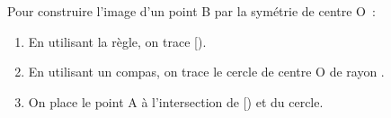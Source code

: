 Pour construire l'image d'un point B par la symétrie de centre O~:
\begin{enumerate}
    \item En utilisant la règle, on trace [).
    \item En utilisant un compas, on trace le cercle de centre O de rayon .
    \item On place le point A à l'intersection de [) et du cercle.
\end{enumerate}
